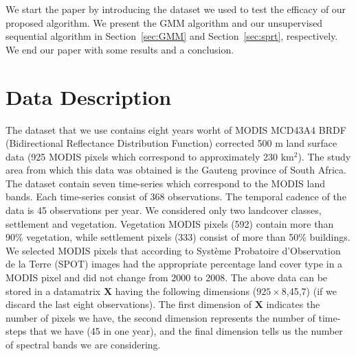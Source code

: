 \documentclass{article}
\begin{document}
We start the paper by introducing the dataset we used to test the efficacy of our proposed algorithm. We present the GMM algorithm and our unsupervised sequential algorithm in Section~\ref{sec:GMM} and 
Section~\ref{sec:sprt}, respectively. We end our paper with some results and a conclusion.
\section{Data Description}
\label{sec:data}
The dataset that we use contains eight years worht of MODIS MCD43A4 BRDF (Bidirectional Reflectance Distribution Function) corrected 500 m land surface
data (925 MODIS pixels which correspond to approximately 230 km$^2$). The study area from which this data was obtained is the Gauteng province of South Africa. The dataset contain seven time-series which correspond to the 
MODIS land bands. Each time-series consist of 368 observations. The temporal cadence of the data is 45 observations per year. We considered only two landcover classes, settlement and vegetation. 
Vegetation MODIS pixels (592) contain more than 90\% vegetation, while settlement pixels (333) consist of more than 50\% buildings. We selected MODIS pixels that according to Système Probatoire d’Observation de la Terre (SPOT) images had the appropriate percentage land cover type in a MODIS pixel and did not change from 2000 to 2008. The above data can be stored in a datamatrix $\mathbf{X}$ having the following dimensions ($925\times8$,45,7) (if we discard the last eight observations). The first dimension of $\mathbf{X}$ indicates the number of pixels we have, the second dimension represents the number of time-steps that we have (45 in one year), and the final dimension tells us the number of spectral bands we are considering.
\end{document}
